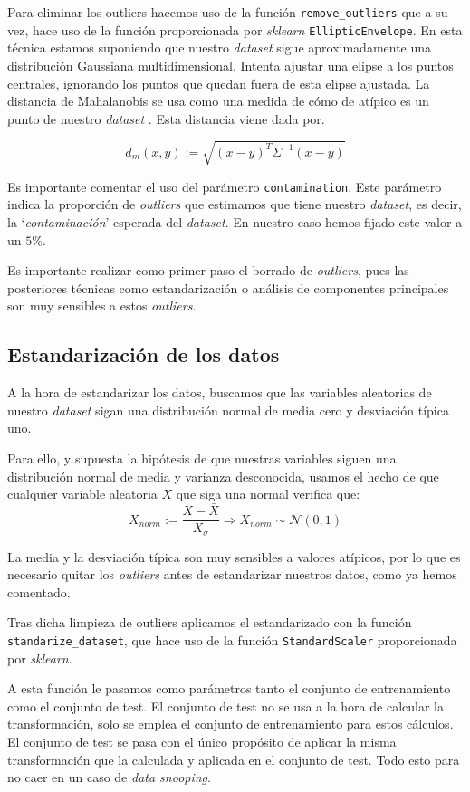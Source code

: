 \documentclass[11pt]{article}
\begin{document}
Para eliminar los outliers hacemos uso de la función \lstinline{remove_outliers} que a su vez, hace uso de la función proporcionada por \emph{sklearn} \lstinline{EllipticEnvelope}. En esta técnica estamos suponiendo que nuestro \emph{dataset} sigue aproximadamente una distribución Gaussiana multidimensional. Intenta ajustar una elipse a los puntos centrales, ignorando los puntos que quedan fuera de esta elipse ajustada. La distancia de Mahalanobis se usa como una medida de cómo de atípico es un punto de nuestro \emph{dataset} \cite{sklearn_outlier:online}. Esta distancia viene dada por.

$$d_m(x, y) := \sqrt{(x - y)^T \Sigma^{-1} (x - y)}$$

Es importante comentar el uso del parámetro \lstinline{contamination}. Este parámetro indica la proporción de \emph{outliers} que estimamos que tiene nuestro \emph{dataset}, es decir, la `\emph{contaminación}' esperada del \emph{dataset}. En nuestro caso hemos fijado este valor a un $5\%$.

Es importante realizar como primer paso el borrado de \emph{outliers}, pues las posteriores técnicas como estandarización o análisis de componentes principales son muy sensibles a estos \emph{outliers}.

\subsection{Estandarización de los datos}

A la hora de estandarizar los datos, buscamos que las variables aleatorias de nuestro \emph{dataset} sigan una distribución normal de media cero y desviación típica uno.

Para ello, y supuesta la hipótesis de que nuestras variables siguen una distribución normal de media y varianza desconocida, usamos el hecho de que cualquier variable aleatoria $X$ que siga una normal verifica que:
$$X_{norm} := \frac{{X- \bar{X}}}{X_{\sigma}} \Longrightarrow X_{norm} \sim \mathcal{N}(0, 1)$$

La media y la desviación típica son muy sensibles a valores atípicos, por lo que es necesario quitar los \emph{outliers} antes de estandarizar nuestros datos, como ya hemos comentado.

Tras dicha limpieza de outliers aplicamos el estandarizado con la función \lstinline{standarize_dataset}, que hace uso de la función \lstinline{StandardScaler} proporcionada por \emph{sklearn}.

A esta función le pasamos como parámetros tanto el conjunto de entrenamiento como el conjunto de test. El conjunto de test no se usa a la hora de calcular la transformación, solo se emplea el conjunto de entrenamiento para estos cálculos. El conjunto de test se pasa con el único propósito de aplicar la misma transformación que la calculada y aplicada en el conjunto de test. Todo esto para no caer en un caso de \emph{data snooping}.
\end{document}

